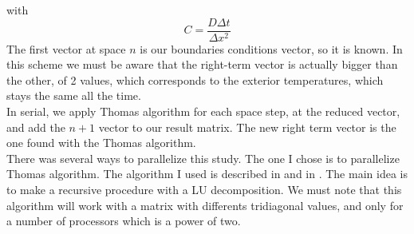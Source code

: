 \documentclass{article}
\begin{document}
                    with $$C = \frac{D\Delta t}{\Delta x ^2}  $$ 
                    The first vector at space $n$ is our boundaries conditions vector, so it is known.
                    In this scheme we must be aware that the right-term vector is actually bigger than
                    the other, of 2 values, which corresponds to the exterior temperatures, which stays
                    the same all the time.\\
                    In serial, we apply Thomas algorithm for each space step, at the reduced vector, and add the $n+1$ vector to our 
                    result matrix. The new right term vector is the one found with the Thomas algorithm.\\
                    There was several ways to parallelize this study. The one I chose is to
                    parallelize Thomas algorithm. The algorithm I used is described in \cite{thomasalg1}
                    and in \cite{thomasalg2}. The main idea is to make a recursive procedure with a LU decomposition.
                    We must note that this algorithm will work with a matrix with differents tridiagonal values, and only for
                    a number of processors which is a power of two.
\end{document}
